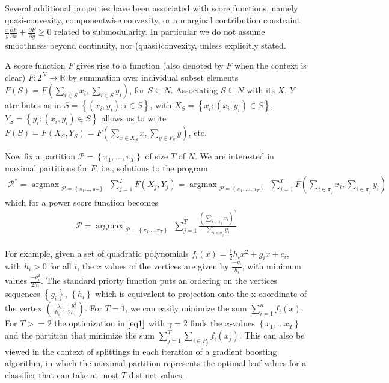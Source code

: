 \documentclass{article}
\theoremstyle{case}
\DeclareMathOperator*{\argmax}{argmax} %
\begin{document}
Several additional properties have been associated with score functions, namely quasi-convexity, componentwise convexity, or a marginal contribution constraint $\frac{x}{y} \frac{\partial F}{\partial x} + \frac{\partial F}{\partial y} \geq 0$ related to submodularity. In particular we do not assume smoothness beyond continuity, nor (quasi)convexity, unless explicitly stated.

A score function $F$ gives rise to a function (also denoted by $F$ when the context is clear) $F \colon 2^N \rightarrow \mathbb{R}$ by summation over individual subset elements $F(S) = F(\sum_{i \in S} x_i, \sum_{i \in S} y_i)$, for $S \subseteq N$. Associating $S \subseteq N$ with its $X$, $Y$ atrributes as in $S = \left\lbrace \left(x_i, y_i\right) \colon i \in S\right\rbrace$, with $X_S = \left\lbrace x_i \colon \left( x_i, y_i\right) \in S\right\rbrace$, $Y_S = \left\lbrace y_i \colon \left( x_i, y_i\right) \in S\right\rbrace$ allows us to write $F(S) = F(X_S, Y_S) = F(\sum_{x \in X_S}x, \sum_{y \in Y_S}y)$, etc.

Now fix a partition $\mathcal{P} = \left\lbrace \pi_1, \dots, \pi_T\right\rbrace$ of size $T$ of $N$. We are interested in maximal partitions for $F$, i.e., solutions to the program
\begin{align} \label{eq0}
\mathcal{P}^{*} = \argmax_{\substack{\mathcal{P} = \left\lbrace \pi_1 \dots, \pi_T\right\rbrace}} {\sum\limits_{j=1}^{T}F\left( X_j, Y_j\right)} = \argmax_{\substack{\mathcal{P} = \left\lbrace \pi_1, \dots, \pi_T\right\rbrace}} {\sum\limits_{j=1}^{T}F( \sum_{i \in \pi_j}x_i, \sum_{i \in \pi_j}y_i)}
\end{align}
which for a power score function becomes
\begin{align} \label{eq1}
\mathcal{P} = \argmax_{\substack{\mathcal{P} = \left\lbrace \pi_1 \dots, \pi_T\right\rbrace}}\sum_{j=1}^{T}\frac{(\sum_{i \in \pi_j}x_i)^\gamma}{\sum_{i \in \pi_j}y_i}
\end{align}

\vspace{4pt}

For example, given a set of quadratic polynomials $f_i(x) = \frac{1}{2}h_ix^2 + g_ix + c_i$, with $h_i >0$ for all $i$, the $x$ values of the vertices are given by $\frac{-g_i}{h_i}$, with minimum values $\frac{-g_i^2}{2h_i}$. The standard priorty function puts an ordering on the vertices sequences $\left\lbrace g_i\right\rbrace$, $\left\lbrace h_i  \right\rbrace$ which is equivalent to projection onto the x-coordinate of the vertex $\left(\frac{-g_i}{h_i},\frac{-g_i^2}{2h_i}\right)$. For $T = 1$, we can easily minimize the sum $\sum_{i=1}^{n} f_i(x)$. For $T >= 2$ the optimization in $\ref{eq1}$ with $\gamma = 2$ finds the $x$-values $\left\lbrace x_1, \dots x_T\right\rbrace$ and the partition that minimize the sum $\sum_{j=1}^T \sum_{i \in P_j} f_i\left( x_j\right)$. This can also be viewed in the context of splittings in each iteration of a gradient boosting algorithm, in which the maximal partition represents the optimal leaf values for a classifier that can take at most $T$ distinct values.
\end{document}
